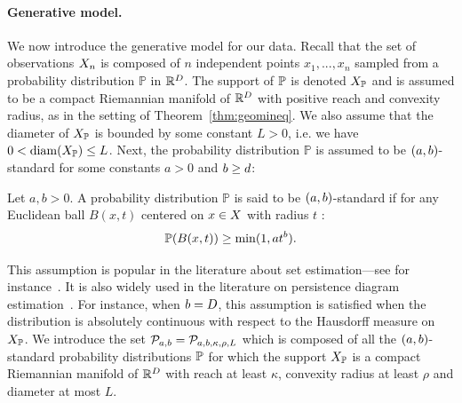 \paragraph{Generative model.}  We now introduce the generative model for our data. %
Recall that the set of observations $X_n$  is composed of $n$ independent points 
$x_1,...,x_n$ sampled from a probability distribution $\mathbb{P}$ in $\mathbb{R}^D$. The support of $\mathbb{P}$ is denoted 
$X_{\mathbb{P}}$ and is assumed to be a compact Riemannian manifold of $\mathbb{R}^D$ with positive reach and convexity radius, 
as in the setting of Theorem~\ref{thm:geomineq}. We also assume that the diameter of $X_{\mathbb{P}}$ is bounded by some constant $L>0$, i.e. we have 
$0 <{\rm diam}(X_{\mathbb{P}})\leq L$. 
Next, the probability distribution $\mathbb{P}$ is assumed to be 
$(a,b)$-standard for some constants $a>0$  and $b\geq d$:

\begin{defin} 
Let $a,b>0$.
A probability distribution $\mathbb{P}$ is said to be 
$(a,b)$-standard if for any Euclidean ball $B(x,t)$ centered on $x\in X$ with radius $t$ :
$$\mathbb{P}(B(x,t)) \geq \min (1,a t^b).$$
\end{defin}

This assumption is popular in the literature about set estimation---see for instance~\cite{Cuevas09,Cuevas04}. 
It is also widely used in the literature on persistence diagram estimation~\cite{Chazal15a,Chazal15c,Fasy14}. 
For instance, when $b=D$, this assumption is satisfied when the distribution is absolutely continuous with 
respect to the Hausdorff measure on $X_{\mathbb{P}}$. 
We introduce the set  $\mathcal{P}_{a,b}=\mathcal{P}_{a,b, \kappa, \rho, L  }$ 
which is composed of all  the $(a,b)$-standard probability distributions $\mathbb{P}$ for which the support $X_{\mathbb{P}}$ 
is a compact Riemannian manifold of $\mathbb{R}^D$ with reach at least $\kappa$, convexity radius at least $\rho $
and diameter at most $L$. 
 
